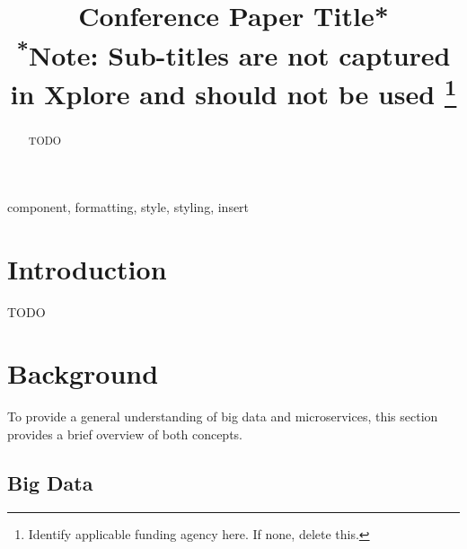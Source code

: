 \documentclass[conference]{IEEEtran}
\begin{document}
\title{Conference Paper Title*\\
{\footnotesize \textsuperscript{*}Note: Sub-titles are not captured in Xplore and
should not be used}
\thanks{Identify applicable funding agency here. If none, delete this.}
}

\author{
\and
{}

}

\maketitle

\begin{abstract}
TODO
\end{abstract}

\begin{IEEEkeywords}
component, formatting, style, styling, insert
\end{IEEEkeywords}

\section{Introduction}
TODO

\section{Background}

To provide a general understanding of big data and microservices, this section provides a brief overview of both concepts.

\subsection{Big Data}
\end{document}
